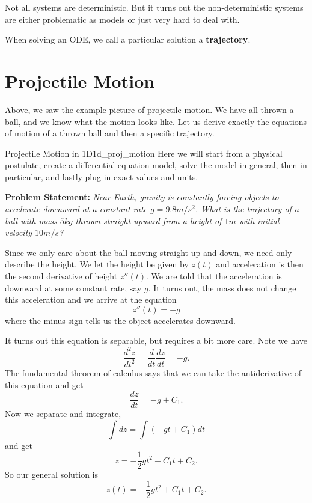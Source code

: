         Not all systems are deterministic.  But it turns out the non-deterministic systems are either problematic as models or just very hard to deal with.
        
        When solving an ODE, we call a particular solution a \textbf{trajectory}.
        
        
        \section{Projectile Motion}
        Above, we saw the example picture of projectile motion.  We have all thrown a ball, and we know what the motion looks like.  Let us derive exactly the equations of motion of a thrown ball and then a specific trajectory.
        
        \begin{ex}{Projectile Motion in 1D}{1d_proj_motion}
        Here we will start from a physical postulate, create a differential equation model, solve the model in general, then in particular, and lastly plug in exact values and units.
        
        \noindent \textbf{Problem Statement:} \emph{Near Earth, gravity is constantly forcing objects to accelerate downward at a constant rate $g=9.8m/s^2$. What is the trajectory of a ball with mass $5kg$ thrown straight upward from a height of $1m$ with initial velocity $10m/s$?}
        
        Since we only care about the ball moving straight up and down, we need only describe the height.  We let the height be given by $z(t)$ and acceleration is then the second derivative of height $z''(t)$.  We are told that the acceleration is downward at some constant rate, say $g$.  It turns out, the mass does not change this acceleration and we arrive at the equation
        \[
        z''(t)=-g
        \]
        where the minus sign tells us the object accelerates downward.
        
        It turns out this equation is separable, but requires a bit more care.  Note we have
        \[
        \frac{d^2z}{dt^2}=\frac{d}{dt}\frac{dz}{dt}=-g.
        \]
        The fundamental theorem of calculus says that we can take the antiderivative of this equation and get
        \[
        \frac{dz}{dt}=-g+C_1.
        \]
        Now we separate and integrate,
        \[
        \int dz = \int (-gt+C_1)dt
        \]
        and get
        \[
        z= -\frac{1}{2}gt^2+C_1t+C_2.
        \]
        So our general solution is
        \[
        z(t)=-\frac{1}{2}gt^2+C_1t+C_2.
        \]
        

\end{ex}

